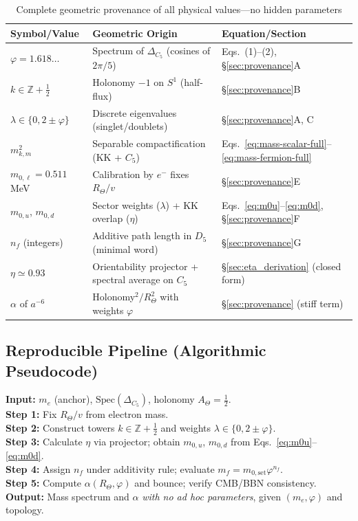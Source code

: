 \documentclass[12pt]{article}
\begin{document}
\begin{table}[H]
\centering
\small
\caption{Complete geometric provenance of all physical values—no hidden parameters}
\label{tab:provenance}
\begin{tabular}{>{\raggedright}p{2.8cm} >{\raggedright\arraybackslash}p{5.4cm} >{\raggedright\arraybackslash}p{5.4cm}}
\toprule
\textbf{Symbol/Value} & \textbf{Geometric Origin} & \textbf{Equation/Section} \\
\midrule
$\varphi = 1.618\ldots$ & Spectrum of $\Delta_{C_5}$ (cosines of $2\pi/5$) & Eqs.~(1)--(2), \S\ref{sec:provenance}A \\
$k \in \mathbb{Z} + \tfrac{1}{2}$ & Holonomy $-1$ on $S^1$ (half-flux) & \S\ref{sec:provenance}B \\
$\lambda \in \{0, 2 \pm \varphi\}$ & Discrete eigenvalues (singlet/doublets) & \S\ref{sec:provenance}A, C \\
$m^2_{k,m}$ & Separable compactification (KK + $C_5$) & Eqs.~\eqref{eq:mass-scalar-full}--\eqref{eq:mass-fermion-full} \\
$m_{0,\ell} = 0.511$ MeV & Calibration by $e^-$ fixes $R_\Theta / v$ & \S\ref{sec:provenance}E \\
$m_{0,u}$, $m_{0,d}$ & Sector weights ($\lambda$) + KK overlap ($\eta$) & Eqs.~\eqref{eq:m0u}--\eqref{eq:m0d}, \S\ref{sec:provenance}F \\
$n_f$ (integers) & Additive path length in $D_5$ (minimal word) & \S\ref{sec:provenance}G \\
$\eta \simeq 0.93$ & Orientability projector + spectral average on $C_5$ & \S\ref{sec:eta_derivation} (closed form) \\
$\alpha$ of $a^{-6}$ & Holonomy$^2 / R_\Theta^2$ with weights $\varphi$ & \S\ref{sec:provenance} (stiff term) \\
\bottomrule
\end{tabular}
\end{table}

\subsection{Reproducible Pipeline (Algorithmic Pseudocode)}

\noindent\textbf{Input:} $m_e$ (anchor), $\text{Spec}(\Delta_{C_5})$, holonomy $A_\Theta = \tfrac{1}{2}$. \\[4pt]
\textbf{Step 1:} Fix $R_\Theta / v$ from electron mass. \\
\textbf{Step 2:} Construct towers $k \in \mathbb{Z} + \tfrac{1}{2}$ and weights $\lambda \in \{0, 2 \pm \varphi\}$. \\
\textbf{Step 3:} Calculate $\eta$ via projector; obtain $m_{0,u}$, $m_{0,d}$ from Eqs.~\eqref{eq:m0u}--\eqref{eq:m0d}. \\
\textbf{Step 4:} Assign $n_f$ under additivity rule; evaluate $m_f = m_{0,\text{set}} \varphi^{n_f}$. \\
\textbf{Step 5:} Compute $\alpha(R_\Theta, \varphi)$ and bounce; verify CMB/BBN consistency. \\[4pt]
\textbf{Output:} Mass spectrum and $\alpha$ \textit{with no ad hoc parameters}, given $(m_e, \varphi)$ and topology.
\end{document}
